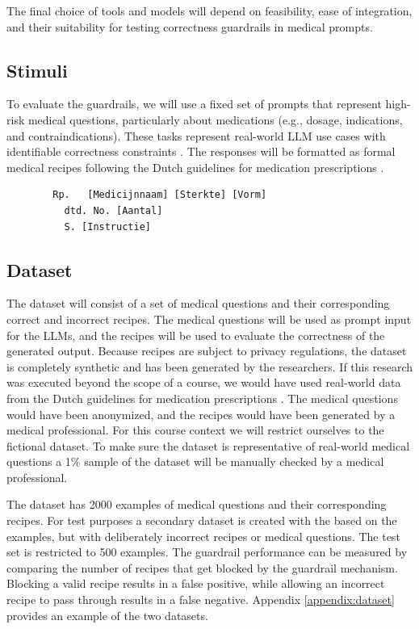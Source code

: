 The final choice of tools and models will depend on feasibility, ease of integration, and their suitability for testing correctness guardrails in medical prompts.

\subsection{Stimuli}

To evaluate the guardrails, we will use a fixed set of prompts that represent high-risk medical questions, particularly about medications (e.g., dosage, indications, and contraindications).
These tasks represent real-world LLM use cases with identifiable correctness constraints \citep{pais2024medication}.
The responses will be formatted as formal medical recipes following the Dutch guidelines for medication prescriptions \citep{farmacotherapeutischkompas}.
\begin{verbatim}
        Rp.   [Medicijnnaam] [Sterkte] [Vorm]
          dtd. No. [Aantal]
          S. [Instructie]
\end{verbatim}

\subsection{Dataset}

The dataset will consist of a set of medical questions and their corresponding correct and incorrect recipes.
The medical questions will be used as prompt input for the LLMs, and the recipes will be used to evaluate the correctness of the generated output.
Because recipes are subject to privacy regulations, the dataset is completely synthetic and has been generated by the researchers.
If this research was executed beyond the scope of a course, we would have used real-world data from the Dutch guidelines for medication prescriptions \citep{farmacotherapeutischkompas}.
The medical questions would have been anonymized, and the recipes would have been generated by a medical professional.
For this course context we will restrict ourselves to the fictional dataset.
To make sure the dataset is representative of real-world medical questions a 1\% sample of the dataset will be manually checked by a medical professional.

The dataset has 2000 examples of medical questions and their corresponding recipes.
For test purposes a secondary dataset is created with the based on the examples, but with deliberately incorrect recipes or medical questions.
The test set is restricted to 500 examples.
The guardrail performance can be measured by comparing the number of recipes that get blocked by the guardrail mechanism.
Blocking a valid recipe results in a false positive, while allowing an incorrect recipe to pass through results in a false negative.
Appendix \ref{appendix:dataset} provides an example of the two datasets.

